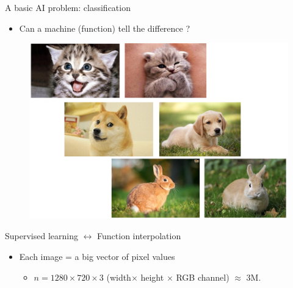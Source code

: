 \documentclass{beamer}
\begin{document}
\begin{CJK*}{UTF8}{gbsn}
\begin{frame}{A basic AI problem: classification}
\begin{itemize}
	\item Can a machine (function) tell the difference ?
\end{itemize}
\begin{figure}
	\begin{center}
		\includegraphics[width=.7\textwidth, height=.6\textheight]{figures/cat-dog-1.png} 
	\end{center}
\end{figure}

\end{frame}

\begin{frame}{Supervised learning $\leftrightarrow$ Function interpolation}
\begin{itemize}
\item Each image = a big vector of pixel values 
\begin{itemize}
	\item $n=1280\times720\times3$ (width$\times$ height $\times$ RGB channel) $\approx$ 3M. 
\end{itemize}


\end{itemize}
\end{frame}
\end{CJK*}
\end{document}
